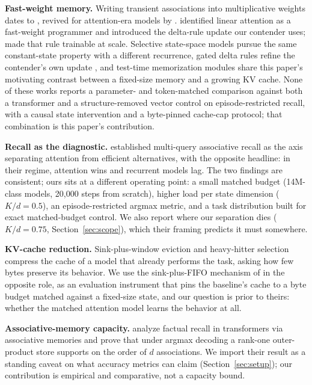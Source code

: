 \documentclass{article}
\begin{document}
\textbf{Fast-weight memory.} Writing transient associations into
multiplicative weights dates to \citet{schmidhuber1992learning}, revived
for attention-era models by \citet{ba2016using}. \citet{schlag2021linear}
identified linear attention \citep{katharopoulos2020transformers} as a
fast-weight programmer and introduced the delta-rule update our contender
uses; \citet{yang2024parallelizing} made that rule trainable at scale.
Selective state-space models \citep{gu2023mamba} pursue the same
constant-state property with a different recurrence, gated delta rules
refine the contender's own update \citep{yang2024gated}, and test-time
memorization modules \citep{behrouz2024titans} share this paper's
motivating contrast between a fixed-size memory and a growing KV cache.
None of these works
reports a parameter- and token-matched comparison against both a
transformer and a structure-removed vector control on episode-restricted
recall, with a causal state intervention and a byte-pinned cache-cap
protocol; that combination is this paper's contribution.

\textbf{Recall as the diagnostic.} \citet{arora2023zoology} established
multi-query associative recall as the axis separating attention from
efficient alternatives, with the opposite headline: in their regime,
attention wins and recurrent models lag. The two findings are consistent;
ours sits at a different operating point: a small matched budget
(14M-class models, 20{,}000 steps from scratch), higher load per state
dimension ($K/d = 0.5$), an episode-restricted argmax metric, and a task
distribution built for exact matched-budget control. We also report where
our separation dies ($K/d = 0.75$, Section~\ref{sec:scope}), which their
framing predicts it must somewhere.

\textbf{KV-cache reduction.} Sink-plus-window eviction
\citep{xiao2023efficient} and heavy-hitter selection \citep{zhang2023h2o}
compress the cache of a model that already performs the task, asking how
few bytes preserve its behavior. We use the sink-plus-FIFO mechanism of
\citet{xiao2023efficient} in the opposite role, as an evaluation
instrument that pins the baseline's cache to a byte budget matched against
a fixed-size state, and our question is prior to theirs: whether the
matched attention model learns the behavior at all.

\textbf{Associative-memory capacity.} \citet{nichani2024understanding}
analyze factual recall in transformers via associative memories and prove
that under argmax decoding a rank-one outer-product store supports on the
order of $d$ associations. We import their result as a standing caveat on
what accuracy metrics can claim (Section~\ref{sec:setup}); our
contribution is empirical and comparative, not a capacity bound.
\end{document}

